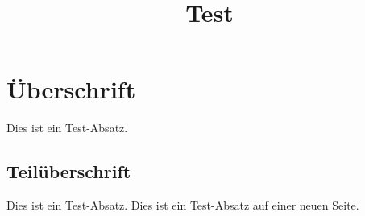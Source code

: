 \documentclass[twoside,titlepage]{article}
\begin{document}
  \title{Test}
  \maketitle
  \newpage

  \section{Überschrift}
  Dies ist ein Test-Absatz.

  \subsection{Teilüberschrift}
  Dies ist ein Test-Absatz. \newpage
  Dies ist ein Test-Absatz auf einer neuen Seite.
\end{document}

